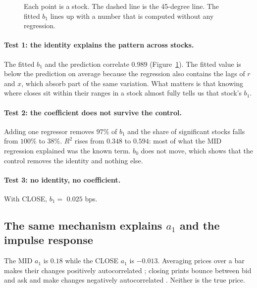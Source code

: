 \documentclass[11pt,a4paper]{article}
\begin{document}
\begin{figure}[htbp]
\caption{Each point is a stock. The dashed line is the 45-degree line. The fitted $b_1$ lines up with a
number that is computed without any regression.}
\label{fig:scatter}
\end{figure}

\paragraph{Test 1: the identity explains the pattern across stocks.} The fitted $b_1$ and the prediction
correlate $0.989$ (Figure~\ref{fig:scatter}). The fitted value is below the prediction on average
because the regression also contains the lags of $r$ and $x$, which absorb part of the same variation.
What matters is that knowing where closes sit within their ranges in a stock almost fully tells us that
stock's $b_1$.

\paragraph{Test 2: the coefficient does not survive the control.} Adding one regressor removes
$97\%$ of $b_1$ and the share of significant stocks falls from $100\%$ to $38\%$.
$R^2$ rises from $0.348$ to $0.594$: most of what the MID regression explained was the known
term. $b_0$ does not move, which shows that the control removes the identity and nothing else.

\paragraph{Test 3: no identity, no coefficient.} With CLOSE, $b_1 =$ $0.025$ bps.

\subsection{The same mechanism explains $a_1$ and the impulse response}

The MID $a_1$ is $0.18$ while the CLOSE $a_1$ is $-0.013$. Averaging prices over a bar makes their
changes positively autocorrelated \citep{working1960}; closing prints bounce between bid and ask and
make changes negatively autocorrelated \citep{roll1984}. Neither is the true price.
\end{document}
